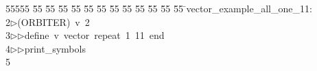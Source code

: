 %
%
\begin{tabbing}
55555 \= 55 \= 55 \= 55 \= 55 \= 55 \= 55 \= 55 \= 55 \= 55 \= 55 \= 55 \= 55 \= \>vector\_example\_all\_one\_11:\\[0pt]
2\>$\triangleright$\>(ORBITER)\ v\ 2\ \\[0pt]
3\>$\triangleright$\>$\triangleright$\>define\ v\ vector\ repeat\ 1\ 11\ end\ \\[0pt]
4\>$\triangleright$\>$\triangleright$\>print\_symbols\\[0pt]
5\>\end{tabbing}
